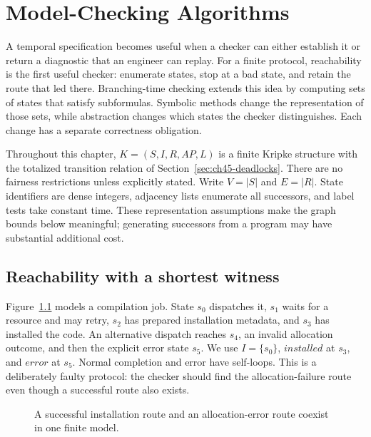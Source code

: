 \chapter{Model-Checking Algorithms}
\label{ch:model-checking-algorithms}

A temporal specification becomes useful when a checker can either establish it or return a diagnostic that an engineer can replay.
For a finite protocol, reachability is the first useful checker: enumerate states, stop at a bad state, and retain the route that led there.
Branching-time checking extends this idea by computing sets of states that satisfy subformulas.
Symbolic methods change the representation of those sets, while abstraction changes which states the checker distinguishes.
Each change has a separate correctness obligation.

Throughout this chapter, $K=(S,I,R,AP,L)$ is a finite Kripke structure with the totalized transition relation of Section~\ref{sec:ch45-deadlocks}.
There are no fairness restrictions unless explicitly stated.
Write $V=|S|$ and $E=|R|$.
State identifiers are dense integers, adjacency lists enumerate all successors, and label tests take constant time.
These representation assumptions make the graph bounds below meaningful; generating successors from a program may have substantial additional cost.

\section{Reachability with a shortest witness}
\label{sec:ch46-reachability}

Figure~\ref{fig:ch46-work-graph} models a compilation job.
State $s_0$ dispatches it, $s_1$ waits for a resource and may retry, $s_2$ has prepared installation metadata, and $s_3$ has installed the code.
An alternative dispatch reaches $s_4$, an invalid allocation outcome, and then the explicit error state $s_5$.
We use $I=\{s_0\}$, $\mathit{installed}$ at $s_3$, and $\mathit{error}$ at $s_5$.
Normal completion and error have self-loops.
This is a deliberately faulty protocol: the checker should find the allocation-failure route even though a successful route also exists.

\begin{figure}[tbp]
\centering

\caption{A successful installation route and an allocation-error route coexist in one finite model.}
\label{fig:ch46-work-graph}
\end{figure}

